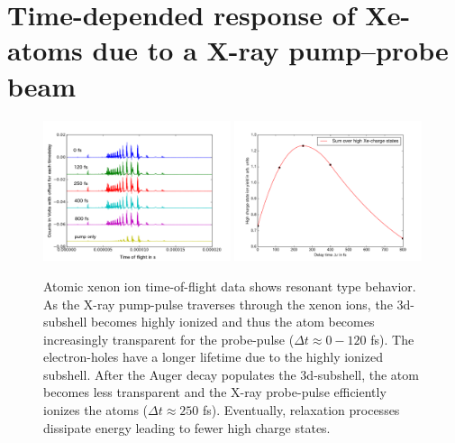 \section{Time-depended response of Xe-atoms due to a X-ray pump--probe beam}\label{sec:time-resolved-xe-atoms}
\begin{figure}
	\centering
		\includegraphics[width=0.49\textwidth]{images/results/TOF-atomic-xenon.png}
		\includegraphics[width=0.49\textwidth]{images/results/atomic-charge-state-time-resolved.pdf}
	\caption[Time-resolved answer of atomic xenon in TOF spectroscopy.]{Atomic xenon ion time-of-flight data shows resonant type behavior. As the X-ray pump-pulse traverses through the xenon ions, the 3d-subshell becomes highly ionized and thus the atom becomes increasingly transparent for the probe-pulse ($\Delta t \approx 0-120$ fs). The electron-holes have a longer lifetime due to the highly ionized subshell. After the Auger decay populates the 3d-subshell, the atom becomes less transparent and the X-ray probe-pulse efficiently ionizes the atoms ($\Delta t \approx 250$ fs). Eventually, relaxation processes dissipate energy leading to fewer high charge states.}
	\label{fig:TOF-atomic-xenon}
\end{figure}
